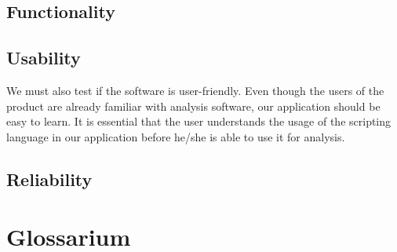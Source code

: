 \documentclass[a4paper]{article}
\begin{document}
\subsection{Functionality}

\subsection{Usability}
We must also test if the software is user-friendly. Even though the users of the
product are already familiar with analysis software, our application should be
easy to learn. It is essential that the user understands the usage of the
scripting language in our application before he/she is able to use it for
analysis. %

\subsection{Reliability}


\section{Glossarium}
\end{document}
